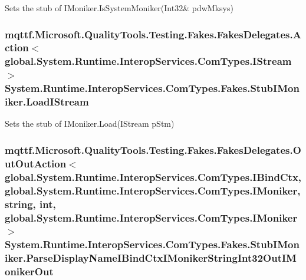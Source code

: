 Sets the stub of I\-Moniker.\-Is\-System\-Moniker(Int32\& pdw\-Mksys)

\hypertarget{class_system_1_1_runtime_1_1_interop_services_1_1_com_types_1_1_fakes_1_1_stub_i_moniker_aa4bbfdfc71a565b04b632e0ddfe44414}{
\subsubsection[{Load\-I\-Stream}]{\setlength{\rightskip}{0pt plus 5cm}mqttf.\-Microsoft.\-Quality\-Tools.\-Testing.\-Fakes.\-Fakes\-Delegates.\-Action$<$global.\-System.\-Runtime.\-Interop\-Services.\-Com\-Types.\-I\-Stream$>$ System.\-Runtime.\-Interop\-Services.\-Com\-Types.\-Fakes.\-Stub\-I\-Moniker.\-Load\-I\-Stream}}\label{class_system_1_1_runtime_1_1_interop_services_1_1_com_types_1_1_fakes_1_1_stub_i_moniker_aa4bbfdfc71a565b04b632e0ddfe44414}


Sets the stub of I\-Moniker.\-Load(\-I\-Stream p\-Stm)

\hypertarget{class_system_1_1_runtime_1_1_interop_services_1_1_com_types_1_1_fakes_1_1_stub_i_moniker_a4585b5ed6d1e7e9e71c9554c1cc75116}{
\subsubsection[{Parse\-Display\-Name\-I\-Bind\-Ctx\-I\-Moniker\-String\-Int32\-Out\-I\-Moniker\-Out}]{\setlength{\rightskip}{0pt plus 5cm}mqttf.\-Microsoft.\-Quality\-Tools.\-Testing.\-Fakes.\-Fakes\-Delegates.\-Out\-Out\-Action$<$global.\-System.\-Runtime.\-Interop\-Services.\-Com\-Types.\-I\-Bind\-Ctx, global.\-System.\-Runtime.\-Interop\-Services.\-Com\-Types.\-I\-Moniker, string, int, global.\-System.\-Runtime.\-Interop\-Services.\-Com\-Types.\-I\-Moniker$>$ System.\-Runtime.\-Interop\-Services.\-Com\-Types.\-Fakes.\-Stub\-I\-Moniker.\-Parse\-Display\-Name\-I\-Bind\-Ctx\-I\-Moniker\-String\-Int32\-Out\-I\-Moniker\-Out}}\label{class_system_1_1_runtime_1_1_interop_services_1_1_com_types_1_1_fakes_1_1_stub_i_moniker_a4585b5ed6d1e7e9e71c9554c1cc75116}


